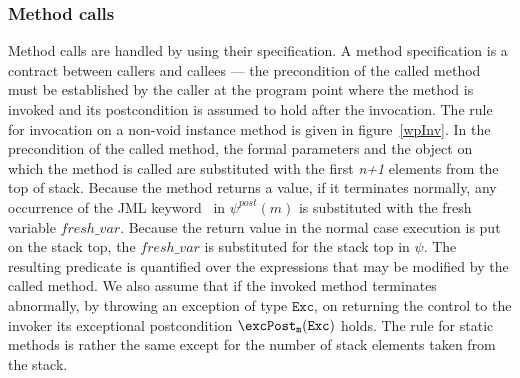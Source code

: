 \subsubsection{Method calls}
Method calls are handled by using their specification. A method specification is a contract between callers and callees --- the precondition of the called method
must be established by the caller at the program point where the method is invoked and its postcondition is assumed to hold after the invocation. The rule for
invocation on a non-void instance method is given in figure~\ref{wpInv}. In the precondition of the called method, the formal parameters and the object on which the method is called are substituted with the first \textit{n+1} elements from the top of stack. 
Because the method returns a value, if it terminates normally, any occurrence of the JML keyword \result \ in $\psi^{post}(m)$ is substituted with the fresh variable $fresh\_var$.  
Because the return value in the normal case execution is put on the stack top, the $fresh\_var$ is substituted for the stack top in $\psi$. The resulting predicate is quantified over the expressions that may be modified by the called method. We also assume that if the invoked method terminates abnormally, by throwing an exception of type $\texttt{Exc}$, on returning the control to the invoker its exceptional postcondition $\excPost_{\tt{m} }( \tt{Exc} )$ holds. 
The rule for static methods is rather the same except for the number of stack elements taken from the stack.  

